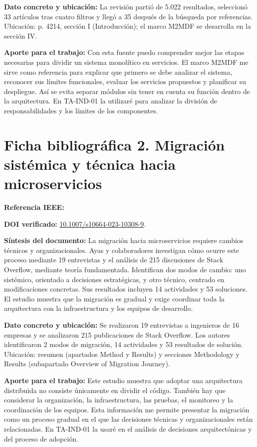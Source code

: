 \documentclass[12pt,a4paper]{article}
\newcommand{\dato}[1]{\textbf{Dato concreto y ubicación:} #1}
\newcommand{\nota}[1]{\textbf{Aporte para el trabajo:} #1}
\newcommand{\resumen}[1]{\textbf{Síntesis del documento:} #1}
\begin{document}
	\dato{La revisión partió de 5.022 resultados, seleccionó 33 artículos tras cuatro filtros y llegó a 35 después de la búsqueda por referencias. Ubicación: p. 4214, sección I (Introducción); el marco M2MDF se desarrolla en la sección IV.}
	
	\nota{Con esta fuente puedo comprender mejor las etapas necesarias para dividir un sistema monolítico en servicios. El marco M2MDF me sirve como referencia para explicar que primero se debe analizar el sistema, reconocer sus límites funcionales, evaluar los servicios propuestos y planificar su despliegue. Así se evita separar módulos sin tener en cuenta su función dentro de la arquitectura. En TA-IND-01 la utilizaré para analizar la división de responsabilidades y los límites de los componentes.}
	
	\section*{Ficha bibliográfica 2. Migración sistémica y técnica hacia microservicios}
	\textbf{Referencia IEEE:} 
	
	\textbf{DOI verificado:} \href{https://doi.org/10.1007/s10664-023-10308-9}{10.1007/s10664-023-10308-9}.\par
	
	\resumen{La migración hacia microservicios requiere cambios técnicos y organizacionales. Ayas y colaboradores investigan cómo ocurre este proceso mediante 19 entrevistas y el análisis de 215 discusiones de Stack Overflow, mediante teoría fundamentada. Identifican dos modos de cambio: uno sistémico, orientado a decisiones estratégicas, y otro técnico, centrado en modificaciones concretas. Sus resultados incluyen 14 actividades y 53 soluciones. El estudio muestra que la migración es gradual y exige coordinar toda la arquitectura con la infraestructura y los equipos de desarrollo.}
	
	\dato{Se realizaron 19 entrevistas a ingenieros de 16 empresas y se analizaron 215 publicaciones de Stack Overflow. Los autores identificaron 2 modos de migración, 14 actividades y 53 resultados de solución. Ubicación: resumen (apartados Method y Results) y secciones Methodology y Results (subapartado Overview of Migration Journey).}
	
	\nota{Este estudio muestra que adoptar una arquitectura distribuida no consiste únicamente en dividir el código. También hay que considerar la organización, la infraestructura, las pruebas, el monitoreo y la coordinación de los equipos. Esta información me permite presentar la migración como un proceso gradual en el que las decisiones técnicas y organizacionales están relacionadas. En TA-IND-01 la usaré en el análisis de decisiones arquitectónicas y del proceso de adopción.}
	
\end{document}
